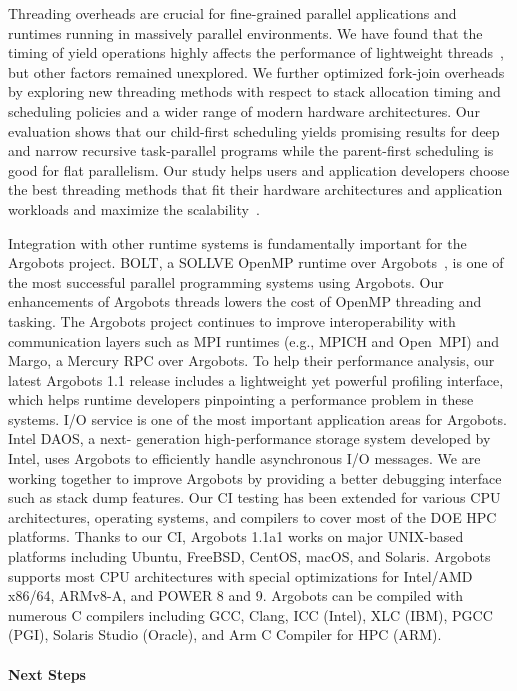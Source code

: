 Threading overheads are crucial for fine-grained parallel applications
and runtimes running in massively parallel environments.  We have
found that the timing of yield operations highly affects the
performance of lightweight threads~\cite{iwasaki2018}, but other
factors remained unexplored.  We further optimized fork-join overheads
by exploring new threading methods with respect to stack allocation
timing and scheduling policies and a wider range of modern hardware
architectures.  Our evaluation shows that our child-first scheduling
yields promising results for deep and narrow recursive task-parallel
programs while the parent-first scheduling is good for flat
parallelism.  Our study helps users and application developers choose
the best threading methods that fit their hardware architectures and
application workloads and maximize the scalability~\cite{iwasaki2020}.

Integration with other runtime systems is fundamentally important for
the Argobots project.  BOLT, a SOLLVE OpenMP runtime over
Argobots~\cite{BOLT}, is one of the most successful parallel
programming systems using Argobots.  Our enhancements of Argobots
threads lowers the cost of OpenMP threading and tasking.  The Argobots
project continues to improve interoperability with communication
layers such as MPI runtimes (e.g., MPICH and Open~MPI) and Margo, a
Mercury RPC over Argobots.  To help their performance analysis, our
latest Argobots 1.1 release includes a lightweight yet powerful
profiling interface, which helps runtime developers pinpointing a
performance problem in these systems.  I/O service is one of the most
important application areas for Argobots. Intel DAOS, a next-
generation high-performance storage system developed by Intel, uses
Argobots to efficiently handle asynchronous I/O messages.  We are
working together to improve Argobots by providing a better debugging
interface such as stack dump features. Our CI testing has been
extended for various CPU architectures, operating systems, and
compilers to cover most of the DOE HPC platforms.  Thanks to our CI,
Argobots 1.1a1 works on major UNIX-based platforms including Ubuntu,
FreeBSD, CentOS, macOS, and Solaris. Argobots supports most CPU
architectures with special optimizations for Intel/AMD x86/64,
ARMv8-A, and POWER 8 and 9. Argobots can be compiled with numerous C
compilers including GCC, Clang, ICC (Intel), XLC (IBM), PGCC (PGI),
Solaris Studio (Oracle), and Arm C Compiler for HPC (ARM).

\paragraph{Next Steps}

